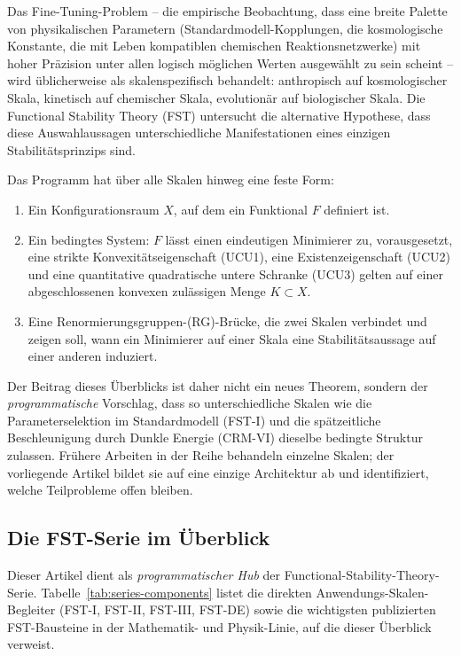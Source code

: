 \documentclass[11pt,a4paper]{article}
\theoremstyle{remark}
\begin{document}
Das Fine-Tuning-Problem -- die empirische Beobachtung, dass eine breite Palette von physikalischen Parametern (Standardmodell-Kopplungen, die kosmologische Konstante, die mit Leben kompatiblen chemischen Reaktionsnetzwerke) mit hoher Präzision unter allen logisch möglichen Werten ausgewählt zu sein scheint -- wird üblicherweise als skalenspezifisch behandelt: anthropisch auf kosmologischer Skala, kinetisch auf chemischer Skala, evolutionär auf biologischer Skala. Die Functional Stability Theory (FST) untersucht die alternative Hypothese, dass diese Auswahlaussagen unterschiedliche Manifestationen eines einzigen Stabilitätsprinzips sind.

Das Programm hat über alle Skalen hinweg eine feste Form:
\begin{enumerate}[label=(\roman*),leftmargin=2em]
\item Ein Konfigurationsraum $X$, auf dem ein Funktional $F$ definiert ist.
\item Ein bedingtes System: $F$ lässt einen eindeutigen Minimierer zu, vorausgesetzt, eine strikte Konvexitätseigenschaft (UCU1), eine Existenzeigenschaft (UCU2) und eine quantitative quadratische untere Schranke (UCU3) gelten auf einer abgeschlossenen konvexen zulässigen Menge $K \subset X$.
\item Eine Renormierungsgruppen-(RG)-Brücke, die zwei Skalen verbindet und zeigen soll, wann ein Minimierer auf einer Skala eine Stabilitätsaussage auf einer anderen induziert.
\end{enumerate}
Der Beitrag dieses Überblicks ist daher nicht ein neues Theorem, sondern der \emph{programmatische} Vorschlag, dass so unterschiedliche Skalen wie die Parameterselektion im Standardmodell (FST-I) und die spätzeitliche Beschleunigung durch Dunkle Energie (CRM-VI) dieselbe bedingte Struktur zulassen. Frühere Arbeiten in der Reihe behandeln einzelne Skalen; der vorliegende Artikel bildet sie auf eine einzige Architektur ab und identifiziert, welche Teilprobleme offen bleiben.

\subsection*{Die FST-Serie im Überblick}
\label{subsec:series-glance-de}

Dieser Artikel dient als \emph{programmatischer Hub} der Functional-Stability-Theory-Serie. Tabelle~\ref{tab:series-components} listet die direkten Anwendungs-Skalen-Begleiter (FST-I, FST-II, FST-III, FST-DE) sowie die wichtigsten publizierten FST-Bausteine in der Mathematik- und Physik-Linie, auf die dieser Überblick verweist.
\end{document}

